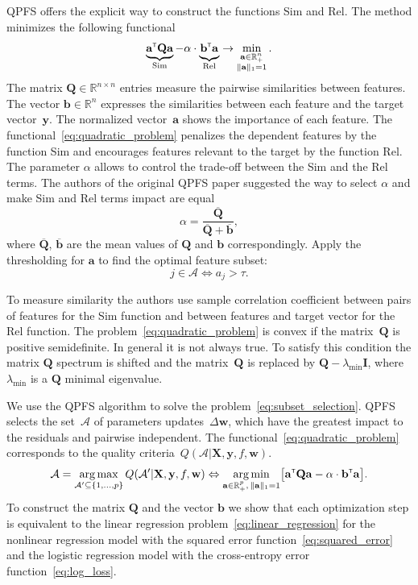 \documentclass[a4paper,12pt]{article}
\theoremstyle{plain} %
\theoremstyle{definition} %
\theoremstyle{remark} %
\newcommand{\ba}{\mathbf{a}}
\newcommand{\bb}{\mathbf{b}}
\newcommand{\bw}{\mathbf{w}}
\newcommand{\by}{\mathbf{y}}
\newcommand{\cA}{\mathcal{A}}
\newcommand{\bQ}{\mathbf{Q}}
\newcommand{\bbR}{\mathbb{R}}
\newcommand{\bX}{\mathbf{X}}
\newcommand{\T}{{\text{\tiny\sffamily\upshape\mdseries T}}}
\newcommand{\argmin}{\mathop{\arg \min}\limits}
\newcommand{\argmax}{\mathop{\arg \max}\limits}
\begin{document}
	QPFS offers the explicit way to construct the functions Sim and Rel. 
	The method minimizes the following functional
	\begin{equation}
	\underbrace{\ba^{\T} \bQ \ba}_{\text{Sim}} - \alpha \cdot \underbrace{\vphantom{()} \mathbf{b}^{\T} \ba}_{\text{Rel}} \rightarrow \min_{\substack{\ba \in \bbR^n_+ \\ \|\ba\|_1=1}}.
	\label{eq:quadratic_problem}
	\end{equation}
	The matrix $\bQ \in \bbR^{n \times n}$ entries measure the pairwise similarities between features. 
	The vector $\mathbf{b} \in \bbR^n$ expresses the similarities between each feature and the target vector~$\by$.
	The normalized vector~$\ba$ shows the importance of each feature. 
	The functional~\eqref{eq:quadratic_problem} penalizes the dependent features by the function Sim and encourages features relevant to the target by the function Rel. 
	The parameter $\alpha$ allows to control the trade-off between the Sim and the Rel terms.
	The authors of the original QPFS paper suggested the way to select $\alpha$ and make Sim and Rel terms impact are equal
	\begin{equation*}
	\alpha = \frac{\overline{\bQ}}{\overline{\bQ} + \overline{\bb}},
	\end{equation*}
	where $\overline{\bQ}$, $\overline{\bb}$ are the mean values of $\bQ$ and $\bb$ correspondingly.
	Apply the thresholding for $\ba$ to find the optimal feature subset:
	\[
	j \in \mathcal{A} \Leftrightarrow a_j > \tau.
	\]
	
	To measure similarity the authors use sample correlation coefficient between pairs of features for the Sim function and between features and target vector for the Rel function.
	The problem~\eqref{eq:quadratic_problem} is convex if the matrix~$\bQ$ is positive semidefinite. In general it is not always true. 
	To satisfy this condition the matrix $\bQ$ spectrum is shifted and the matrix~$\bQ$ is replaced by $\bQ - \lambda_{\text{min}} \mathbf{I}$, where $\lambda_{\text{min}} $ is a $\bQ$ minimal eigenvalue.
	
	We use the QPFS algorithm to solve the problem~\eqref{eq:subset_selection}.
	QPFS selects the set~$\cA$ of parameters updates~$\Delta \bw$, which have the greatest impact to the residuals and pairwise independent.
	The functional~\eqref{eq:quadratic_problem} corresponds to the quality criteria~$Q(\cA | \bX, \by, f, \bw)$.
	\begin{equation}
	\cA = \argmax_{\cA' \subseteq \{1, \dots, p\}} Q(\cA' | \bX, \by, f, \bw) \Leftrightarrow \argmin_{\ba  \in \bbR^p_+, \, \|\ba\|_1=1} \bigl[\ba^{\T} \bQ \ba - \alpha \cdot \mathbf{b}^{\T} \ba \bigr].
	\end{equation}
	To construct the matrix $\bQ$ and the vector $\bb$ we show that each optimization step is equivalent to the linear regression problem~\eqref{eq:linear_regression} for the nonlinear regression model with the squared error function~\eqref{eq:squared_error} and the logistic regression model with the cross-entropy error function~\eqref{eq:log_loss}.
	
\end{document}
